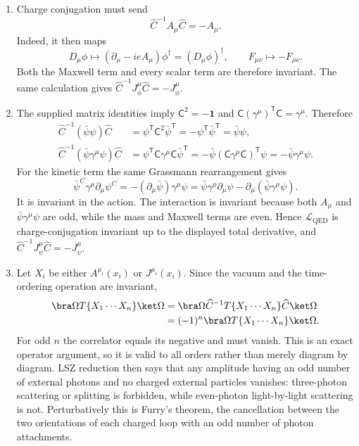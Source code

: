 \begin{enumerate}
\begin{enumerate}
For a constant phase \(\varepsilon=e\Lambda\), so that
\(\delta\phi=-\ii\varepsilon\phi\) and
\(\delta\psi=-\ii\varepsilon\psi\), the unit-normalized Noether currents are
\[
 \boxed{J_\phi^\mu
 =-\ii\bigl[\phi^\dagger D^\mu\phi
 -(D^\mu\phi)^\dagger\phi\bigr],
 \qquad
 J_\psi^\mu=\ii\bar\psi\gamma^\mu\psi.}
\]
Multiplication by the coupling gives the corresponding gauge-source
normalization.  The Euler--Lagrange equations give
\(\partial_\mu J_\phi^\mu=\partial_\mu J_\psi^\mu=0\).
\item
Charge conjugation must send
\[
 \boxed{\widehat C^{-1}A_\mu\widehat C=-A_\mu.}
\]
Indeed, it then maps
\[
 D_\mu\phi\longmapsto
 (\partial_\mu-ieA_\mu)\phi^\dagger=(D_\mu\phi)^\dagger,
 \qquad F_{\mu\nu}\longmapsto-F_{\mu\nu}.
\]
Both the Maxwell term and every scalar term are therefore invariant.  The
same calculation gives
\(\widehat C^{-1}J_\phi^\mu\widehat C=-J_\phi^\mu\).
\item
The supplied matrix identities imply \(\mathsf C^2=-\mathbf1\) and
\(\mathsf C(\gamma^\mu)^{\mathsf T}\mathsf C=\gamma^\mu\).  Therefore
\[
 \begin{split}
 \widehat C^{-1}(\bar\psi\psi)\widehat C
 &=\psi^{\mathsf T}\mathsf C^2\bar\psi^{\mathsf T}
 =-\psi^{\mathsf T}\bar\psi^{\mathsf T}=\bar\psi\psi,\\
 \widehat C^{-1}(\bar\psi\gamma^\mu\psi)\widehat C
 &=\psi^{\mathsf T}\mathsf C\gamma^\mu\mathsf C\bar\psi^{\mathsf T}
 =-\bar\psi(\mathsf C\gamma^\mu\mathsf C)^{\mathsf T}\psi
 =-\bar\psi\gamma^\mu\psi.
 \end{split}
\]
For the kinetic term the same Grassmann rearrangement gives
\[
 \bar\psi^C\gamma^\mu\partial_\mu\psi^C
 =-(\partial_\mu\bar\psi)\gamma^\mu\psi
 =\bar\psi\gamma^\mu\partial_\mu\psi
 -\partial_\mu(\bar\psi\gamma^\mu\psi).
\]
It is invariant in the action.  The interaction is invariant because both
\(A_\mu\) and \(\bar\psi\gamma^\mu\psi\) are odd, while the mass and Maxwell
terms are even.  Hence \(\mathcal L_{\mathrm{QED}}\) is charge-conjugation
invariant up to the displayed total derivative, and
\(\widehat C^{-1}J_\psi^\mu\widehat C=-J_\psi^\mu\).
\item
Let \(X_i\) be either \(A^{\mu_i}(x_i)\) or \(J^{\mu_i}(x_i)\).  Since the
vacuum and the time-ordering operation are invariant,
\[
 \begin{split}
 \bra\Omega T\{X_1\cdots X_n\}\ket\Omega
 &=\bra\Omega\widehat C^{-1}T\{X_1\cdots X_n\}\widehat C\ket\Omega\\
 &=(-1)^n\bra\Omega T\{X_1\cdots X_n\}\ket\Omega.
 \end{split}
\]
For odd \(n\) the correlator equals its negative and must vanish.  This is
an exact operator argument, so it is valid to all orders rather than merely
diagram by diagram.  LSZ reduction then says that any amplitude having an
odd number of external photons and no charged external particles vanishes:
three-photon scattering or splitting is forbidden, while even-photon
light-by-light scattering is not.  Perturbatively this is Furry's theorem,
the cancellation between the two orientations of each charged loop with an
odd number of photon attachments.
\end{enumerate}


\end{enumerate}
